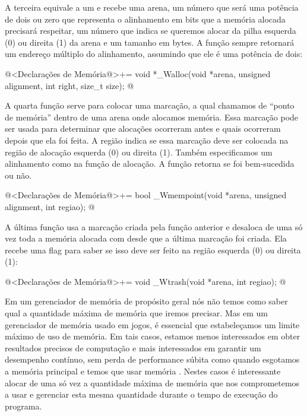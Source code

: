 A terceira equivale a um  e recebe uma arena, um
número que será uma potência de dois ou zero que representa o
alinhamento em bits que a memória alocada precisará respeitar, um
número que indica se queremos alocar da pilha esquerda (0) ou direita
(1) da arena e um tamanho em bytes. A função sempre retornará um
endereço múltiplo do alinhamento, assumindo que ele é uma potência
de dois:

\iniciocodigo
@<Declarações de Memória@>+=
void *_Walloc(void *arena, unsigned alignment, int right, size_t size);
@
\fimcodigo

A quarta função serve para colocar uma marcação, a qual chamamos de
``ponto de memória'' dentro de uma arena onde alocamos memória. Essa
marcação pode ser usada para determinar que alocações ocorreram antes
e quais ocorreram depois que ela foi feita. A região indica se essa
marcação deve ser colocada na região de alocação esquerda (0) ou
direita (1). Também especificamos um alinhamento como na função de
alocação. A função retorna se foi bem-sucedida ou não.

\iniciocodigo
@<Declarações de Memória@>+=
bool _Wmempoint(void *arena, unsigned alignment, int regiao);
@
\fimcodigo

A última função usa a marcação criada pela função anterior e desaloca
de uma só vez toda a memória alocada com  desde que
a última marcação foi criada. Ela recebe uma flag para saber se isso
deve ser feito na região esquerda (0) ou direita (1):

\iniciocodigo
@<Declarações de Memória@>+=
void _Wtrash(void *arena, int regiao);
@
\fimcodigo



Em um gerenciador de memória de propósito geral nós não temos como
saber qual a quantidade máxima de memória que iremos precisar. Mas em
um gerenciador de memória usado em jogos, é essencial que
estabeleçamos um limite máximo de uso de memória. Em tais casos,
estamos menos interessados em obter resultados precisos de computação
e mais interessados em garantir um desempenho contínuo, sem perda de
performance súbita como quando esgotamos a memória principal e temos
que usar memória . Nestes casos é interessante alocar de
uma só vez a quantidade máxima de memória que nos comprometemos a usar
e gerenciar esta mesma quantidade durante o tempo de execução do
programa.

